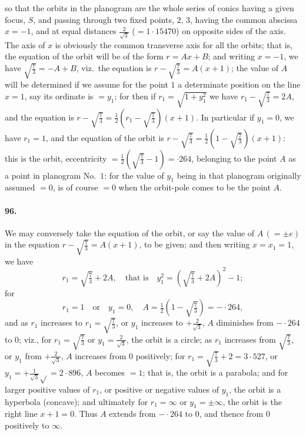 \documentclass[11pt]{article}
\begin{document}
so that the orbits in the planogram are the whole series of conics having a given focus, $S$, and passing through two fixed points, $2,\, 3$, having the common abscissa $x = -1$, and at equal distances $\tfrac{2}{\sqrt{3}}$ ($= 1{\cdot}15470$) on opposite sides of the axis. The axis of $x$ is obviously the common transverse axis for all the orbits; that is, the equation of the orbit will be of the form $r = Ax + B$; and writing $x = -1$, we have $\sqrt{\tfrac{7}{3}} = -A + B$, viz.\ the equation is $r - \sqrt{\tfrac{7}{3}} = A(x + 1)$; the value of $A$ will be determined if we assume for the point $1$ a determinate position on the line $x = 1$, say its ordinate is $= y_{1}$; for then if $r_{1} = \sqrt{1 + y_{1}^{2}}$ we have $r_{1} - \sqrt{\tfrac{7}{3}} = 2A$, and the equation is $r - \sqrt{\tfrac{7}{3}} = \tfrac{1}{2}(r_{1} - \sqrt{\tfrac{7}{3}})(x + 1)$. In particular if $y_{1} = 0$, we have $r_{1} = 1$, and the equation of the orbit is $r - \sqrt{\tfrac{7}{3}} = \tfrac{1}{2}(1 - \sqrt{\tfrac{7}{3}})(x + 1)$: this is the orbit, eccentricity $= \tfrac{1}{2}(\sqrt{\tfrac{7}{3}} - 1) = {\cdot}264$, belonging to the point $A$ as a point in planogram No.~$1$: for the value of $y_{1}$ being in that planogram originally assumed $= 0$, is of course $= 0$ when the orbit-pole comes to be the point $A$.

\paragraph{96.} We may conversely take the equation of the orbit, or say the value of $A\,(= \pm e)$ in the equation $r - \sqrt{\tfrac{7}{3}} = A(x + 1)$, to be given; and then writing $x = x_{1} = 1$, we have
\[
r_{1} = \sqrt{\tfrac{7}{3}} + 2A,\quad\text{that is}\quad y_{1}^{2} = (\sqrt{\tfrac{7}{3}} + 2A)^{2} - 1;
\]
for
\[
r_{1} = 1\quad\text{or}\quad y_{1} = 0,\quad A = \tfrac{1}{2}(1 - \sqrt{\tfrac{7}{3}}) = -{\cdot}264,
\]
and as $r_{1}$ increases to $r_{1} = \sqrt{\tfrac{7}{3}}$, or $y_{1}$ increases to $+\tfrac{2}{\sqrt{3}}$, $A$ diminishes from $-{\cdot}264$ to $0$; viz., for $r_{1} = \sqrt{\tfrac{7}{3}}$ or $y_{1} = \tfrac{2}{\sqrt{3}}$, the orbit is a circle; as $r_{1}$ increases from $\sqrt{\tfrac{7}{3}}$, or $y_{1}$ from $+\tfrac{2}{\sqrt{3}}$, $A$ increases from $0$ positively; for $r_{1} = \sqrt{\tfrac{7}{3}} + 2 = 3{\cdot}527$, or $y_{1} = +\tfrac{1}{\sqrt{3}}\sqrt{} = 2{\cdot}896$, $A$ becomes $= 1$; that is, the orbit is a parabola; and for larger positive values of $r_{1}$, or positive or negative values of $y_{1}$, the orbit is a hyperbola (concave); and ultimately for $r_{1} = \infty$ or $y_{1} = \pm\infty$, the orbit is the right line $x + 1 = 0$. Thus $A$ extends from $-{\cdot}264$ to $0$, and thence from $0$ positively to $\infty$.
\end{document}
